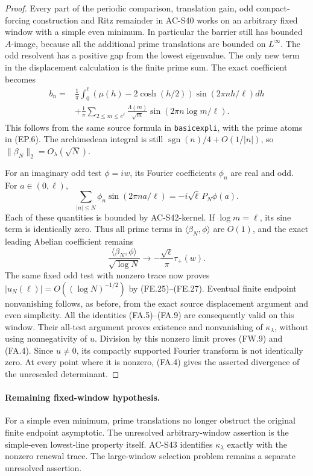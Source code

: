 \begin{proof}
Every part of the periodic comparison, translation gain, odd
compact-forcing construction and Ritz remainder in AC-S40 works
on an arbitrary fixed window with a simple even minimum.
In particular the barrier still has bounded \(A\)-image, because
all the additional prime translations are bounded on \(L^\infty\).
The odd resolvent has a positive gap from the lowest eigenvalue.
The only new term in the displacement calculation is the finite
prime sum.  The exact coefficient becomes
\[
 \begin{split}
 b_n={}&\frac1\pi\int_0^\ell(\mu(h)-2\cosh(h/2))
                                      \sin(2\pi nh/\ell)dh\\
       &+\frac1\pi\sum_{2\leq m\leq e^\ell}
            \frac{\Lambda(m)}{\sqrt m}
                                  \sin(2\pi n\log m/\ell).
 \end{split}                                             \tag{FW.10}
\]
This follows from the same source formula in
\texttt{basicexpli}, with the prime atoms in (EP.6).
The archimedean integral is still
\(\operatorname{sgn}(n)/4+O(1/|n|)\), so
\(\|\beta_N\|_2=O_\lambda(\sqrt N)\).

For an imaginary odd test \(\phi=iw\), its Fourier coefficients
\(\phi_n\) are real and odd.  For \(a\in(0,\ell)\),
\[
 \sum_{|n|\leq N}\phi_n\sin(2\pi na/\ell)
                           =-i\sqrt\ell\,P_N\phi(a).    \tag{FW.11}
\]
Each of these quantities is bounded by AC-S42-kernel.
If \(\log m=\ell\), its sine term is identically zero.
Thus all prime terms in \(\langle\beta_N,\phi\rangle\) are
\(O(1)\), and the exact leading Abelian coefficient remains
\[
 \frac{\langle\beta_N,\phi\rangle}{\sqrt{\log N}}
                      \longrightarrow
                      -\frac{\sqrt\ell}{\pi}\tau_+(w).  \tag{FW.12}
\]
The same fixed odd test with nonzero trace now proves
\(|u_N(\ell)|=O((\log N)^{-1/2})\) by (FE.25)--(FE.27).
Eventual finite endpoint nonvanishing follows, as before, from
the exact source displacement argument and even simplicity.
All the identities (FA.5)--(FA.9) are consequently valid on this
window.  Their all-test argument proves existence and nonvanishing
of \(\kappa_\lambda\), without using nonnegativity of \(u\).
Division by this nonzero limit proves (FW.9) and (FA.4).
Since \(u\ne0\), its compactly supported Fourier transform is
not identically zero.  At every point where it is nonzero,
(FA.4) gives the asserted divergence of the unrescaled determinant.
\end{proof}

\paragraph{Remaining fixed-window hypothesis.}
For a simple even minimum, prime translations no longer obstruct
the original finite endpoint asymptotic.  The unresolved
arbitrary-window assertion is the simple-even lowest-line property
itself.  AC-S43 identifies \(\kappa_\lambda\) exactly with the
nonzero renewal trace.  The large-window selection problem remains
a separate unresolved assertion.
